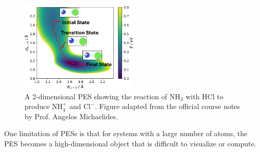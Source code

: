 \documentclass{article}
\theoremstyle{plain}\theoremheaderfont{\normalfont\itshape}\theorembodyfont{\rmfamily}\theoremseparator{.}\newtheorem*{rem}{Remark}\newtheorem*{ex}{Example}\newtheorem*{proof}{Proof}\newtheorem*{altp}{Alternative proof}
\theoremstyle{plain}\theoremheaderfont{\normalfont\bfseries}\theorembodyfont{\rmfamily}\theoremseparator{.}\newtheorem{thm}{Theorem}[section]\newtheorem{lem}[thm]{Lemma}\newtheorem{prop}[thm]{Proposition}\newtheorem*{cor}{Corollary}\newtheorem{defn}[thm]{Definition}\newtheorem{clm}[thm]{Claim}\newtheorem{clminproof}{Claim}\newtheorem{pos}{Postulate}[section]
\theoremstyle{break}\theoremheaderfont{\normalfont\itshape}\theorembodyfont{\rmfamily}\theoremseparator{.\medskip}\newtheorem*{proofskip}{Proof}\newtheorem*{exs}{Examples}\newtheorem*{rems}{Remarks}
\theoremstyle{break}\theoremheaderfont{\normalfont\bfseries}\theorembodyfont{\rmfamily}\theoremseparator{.\medskip}\newtheorem{lemskip}[thm]{Lemma}\newtheorem{defnskip}[thm]{Definition}\newtheorem{propskip}[thm]{Proposition}\newtheorem{thmskip}[thm]{Theorem}
\numberwithin{equation}{section}
\begin{document}
    \begin{figure}
        \centering
        \includegraphics[width=0.5\textwidth]{PES.png}
        \caption{A 2-dimensional PES showing the reaction of \(\mathrm{NH_3}\) with \(\mathrm{HCl}\) to produce \(\mathrm{NH_4^+}\) and \(\mathrm{Cl^-}\). Figure adapted from the official course notes by Prof. Angelos Michaelides.}
        \label{Fig:landscape}
    \end{figure}

    One limitation of PESs is that for systems with a large number of atoms, the PES becomes a high-dimensional object that is difficult to visualize or compute.
\end{document}
